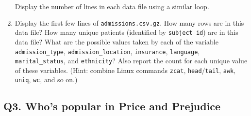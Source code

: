 \documentclass[
]{article}
\newenvironment{Shaded}{\begin{snugshade}}{\end{snugshade}}
\newcommand{\ExtensionTok}[1]{#1}
\newcommand{\FunctionTok}[1]{\textcolor[rgb]{0.00,0.00,0.00}{#1}}
\newcommand{\KeywordTok}[1]{\textcolor[rgb]{0.13,0.29,0.53}{\textbf{#1}}}
\newcommand{\NormalTok}[1]{#1}
\newcommand{\VariableTok}[1]{\textcolor[rgb]{0.00,0.00,0.00}{#1}}
\begin{document}
\begin{enumerate}
\begin{Shaded}
\end{Shaded}

  Display the number of lines in each data file using a similar loop.
\item
  Display the first few lines of \texttt{admissions.csv.gz}. How many
  rows are in this data file? How many unique patients (identified by
  \texttt{subject\_id}) are in this data file? What are the possible
  values taken by each of the variable \texttt{admission\_type},
  \texttt{admission\_location}, \texttt{insurance}, \texttt{language},
  \texttt{marital\_status}, and \texttt{ethnicity}? Also report the
  count for each unique value of these variables. (Hint: combine Linux
  commands \texttt{zcat}, \texttt{head}/\texttt{tail}, \texttt{awk},
  \texttt{uniq}, \texttt{wc}, and so on.)
\end{enumerate}

\hypertarget{q3.-whos-popular-in-price-and-prejudice}{%
\subsection{Q3. Who's popular in Price and
Prejudice}\label{q3.-whos-popular-in-price-and-prejudice}}
\end{document}
